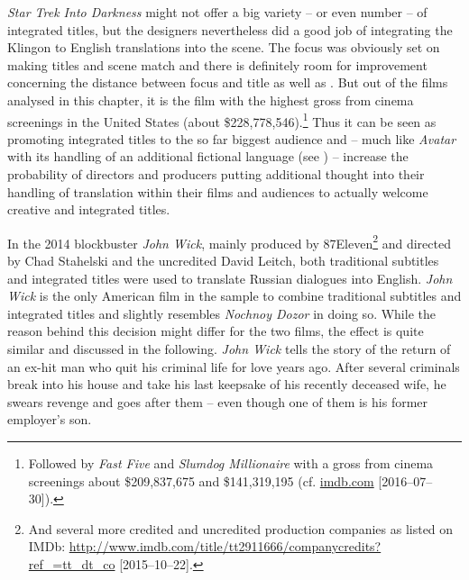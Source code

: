 \textit{Star Trek Into Darkness} might not offer a big variety – or even number – of integrated titles, but the designers nevertheless did a good job of integrating the Klingon to English translations into the scene. The focus was obviously set on making titles and scene match and there is definitely room for improvement concerning the distance between focus and title as well as . But out of the films analysed in this chapter, it is the film with the highest gross from cinema screenings in the United States (about \$228,778,546).\footnote{Followed by \textit{Fast Five} and \textit{Slumdog Millionaire} with a gross from cinema screenings about \$209,837,675 and \$141,319,195 (cf. \url{imdb.com} [2016--07--30]).} Thus it can be seen as promoting integrated titles to the so far biggest audience and – much like \textit{Avatar} with its handling of an additional fictional language (see ) – increase the probability of directors and producers putting additional thought into their handling of translation within their films and audiences to actually welcome creative and integrated titles.

In the 2014 blockbuster \textit{John Wick}, mainly produced by 87Eleven\footnote{And several more credited and uncredited production companies as listed on IMDb: \url{http://www.imdb.com/title/tt2911666/companycredits?ref\_=tt\_dt\_co} [2015--10--22].} and directed by Chad Stahelski and the uncredited David Leitch, both traditional subtitles and integrated titles were used to translate Russian dialogues into English. \textit{John Wick} is the only American film in the sample to combine traditional subtitles and integrated titles and slightly resembles \textit{Nochnoy Dozor} in doing so. While the reason behind this decision might differ for the two films, the effect is quite similar and discussed in the following. \textit{John Wick} tells the story of the return of an ex-hit man who quit his criminal life for love years ago. After several criminals break into his house and take his last keepsake of his recently deceased wife, he swears revenge and goes after them – even though one of them is his former employer’s son.

